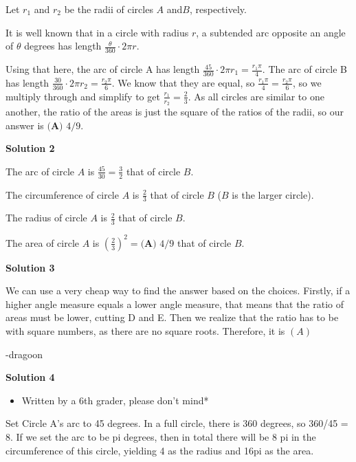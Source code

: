 \begin{enumerate}
Let $r_1$ and $r_2$ be the radii of circles $A$ and$B$, respectively. 

 It is well known that in a circle with radius $r$, a subtended arc opposite an angle of $\theta$ degrees has length $\frac{\theta}{360} \cdot 2\pi r$. 

 Using that here, the arc of circle A has length $\frac{45}{360}\cdot2\pi{r_1}=\frac{r_1\pi}{4}$. The arc of circle B has length $\frac{30}{360} \cdot 2\pi{r_2}=\frac{r_2\pi}{6}$. We know that they are equal, so $\frac{r_1\pi}{4}=\frac{r_2\pi}{6}$, so we multiply through and simplify to get $\frac{r_1}{r_2}=\frac{2}{3}$. As all circles are similar to one another, the ratio of the areas is just the square of the ratios of the radii, so our answer is $\boxed{\textbf{(A) } 4/9}$.

 



\textbf{Solution 2}

The arc of circle $A$ is $\frac{45}{30}=\frac{3}{2}$ that of circle $B$.

 The circumference of circle $A$ is $\frac{2}{3}$ that of circle $B$ ($B$ is the larger circle).

 The radius of circle $A$ is $\frac{2}{3}$ that of circle $B$.

 The area of circle $A$ is ${\left(\frac{2}{3}\right)}^2=\boxed{\textbf{(A) } 4/9}$ that of circle $B$.

 



\textbf{Solution 3}

We can use a very cheap way to find the answer based on the choices. Firstly, if a higher angle measure equals a lower angle measure, that means that the ratio of areas must be lower, cutting D and E. Then we realize that the ratio has to be with square numbers, as there are no square roots. Therefore, it is $(A)$

 -dragoon

 



\textbf{Solution 4}


            \begin{itemize}
        \item Written by a 6th grader, please don't mind*
            \end{itemize}
            Set Circle A's arc to 45 degrees. In a full circle, there is 360 degrees, so 360/45 = 8. If we set the arc to be pi degrees, then in total there will be 8 pi in the circumference of this circle, yielding 4 as the radius and 16pi as the area. 


\end{enumerate}
